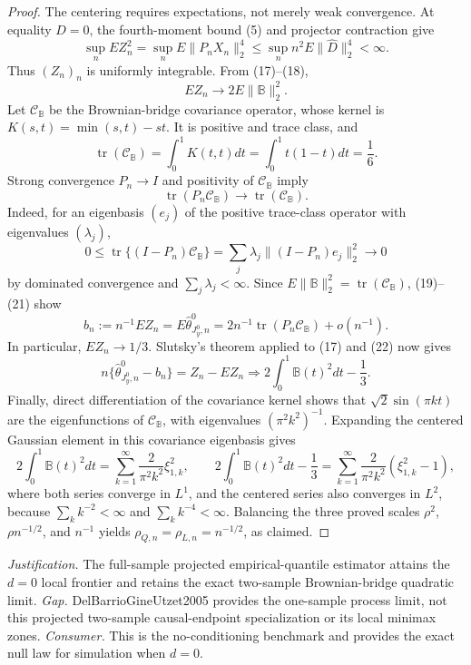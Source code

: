 \documentclass{article}
\begin{document}
\begin{proof}
The centering requires expectations, not merely weak convergence. At equality \(D=0\), the fourth-moment bound (5) and projector contraction give
\[
\sup_n E Z_n^2
=\sup_nE\|P_nX_n\|_2^4
\le\sup_n n^2E\|\widehat D\|_2^4<\infty. \tag{18}
\]
Thus \((Z_n)_n\) is uniformly integrable. From (17)--(18),
\[
EZ_n\longrightarrow2E\|\mathbb B\|_2^2. \tag{19}
\]
Let \(\mathcal C_{\mathbb B}\) be the Brownian-bridge covariance operator, whose kernel is \(K(s,t)=\min(s,t)-st\). It is positive and trace class, and
\[
\operatorname{tr}(\mathcal C_{\mathbb B})
=\int_0^1K(t,t)dt
=\int_0^1t(1-t)dt=\frac16. \tag{20}
\]
Strong convergence \(P_n\to I\) and positivity of \(\mathcal C_{\mathbb B}\) imply
\[
\operatorname{tr}(P_n\mathcal C_{\mathbb B})\to
\operatorname{tr}(\mathcal C_{\mathbb B}). \tag{21}
\]
Indeed, for an eigenbasis \((e_j)\) of the positive trace-class operator with eigenvalues \((\lambda_j)\),
\[
0\le\operatorname{tr}\{(I-P_n)\mathcal C_{\mathbb B}\}
=\sum_j\lambda_j\|(I-P_n)e_j\|_2^2\to0
\]
by dominated convergence and \(\sum_j\lambda_j<\infty\). Since \(E\|\mathbb B\|_2^2=\operatorname{tr}(\mathcal C_{\mathbb B})\), (19)--(21) show
\[
b_n:=n^{-1}EZ_n=E\widehat\theta^0_{J_y^0,n}
=2n^{-1}\operatorname{tr}(P_n\mathcal C_{\mathbb B})+o(n^{-1}). \tag{22}
\]
In particular, \(EZ_n\to1/3\). Slutsky's theorem applied to (17) and (22) now gives
\[
n\{\widehat\theta^0_{J_y^0,n}-b_n\}
=Z_n-EZ_n
\Rightarrow2\int_0^1\mathbb B(t)^2dt-\frac13. \tag{23}
\]
Finally, direct differentiation of the covariance kernel shows that \(\sqrt2\sin(\pi kt)\) are the eigenfunctions of \(\mathcal C_{\mathbb B}\), with eigenvalues \((\pi^2k^2)^{-1}\). Expanding the centered Gaussian element in this covariance eigenbasis gives
\[
2\int_0^1\mathbb B(t)^2dt
=\sum_{k=1}^{\infty}\frac{2}{\pi^2k^2}\xi_{1,k}^2,
\qquad
2\int_0^1\mathbb B(t)^2dt-\frac13
=\sum_{k=1}^{\infty}\frac{2}{\pi^2k^2}(\xi_{1,k}^2-1), \tag{24}
\]
where both series converge in \(L^1\), and the centered series also converges in \(L^2\), because \(\sum_k k^{-2}<\infty\) and \(\sum_k k^{-4}<\infty\). Balancing the three proved scales \(\rho^2\), \(\rho n^{-1/2}\), and \(n^{-1}\) yields \(\rho_{Q,n}=\rho_{L,n}=n^{-1/2}\), as claimed.
\end{proof}
\par\smallskip\noindent \textit{Justification.} The full-sample projected empirical-quantile estimator attains the \(d=0\) local frontier and retains the exact two-sample Brownian-bridge quadratic limit. \textit{Gap.} DelBarrioGineUtzet2005 provides the one-sample process limit, not this projected two-sample causal-endpoint specialization or its local minimax zones. \textit{Consumer.} This is the no-conditioning benchmark and provides the exact null law for simulation when \(d=0\).
\end{document}
